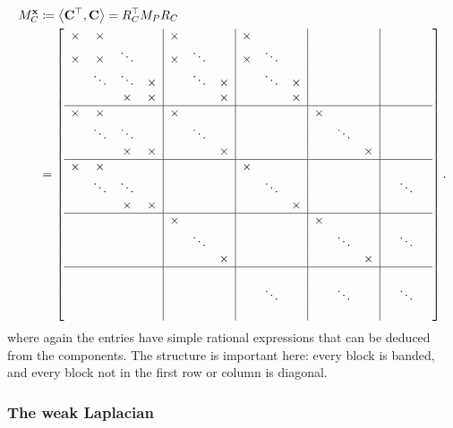\documentclass[hidelinks,onefignum,onetabnum]{siamart220329}
\def\bfC{{\bf C}}
\def\bfx{{\bf x}}
\def\ip<#1>{\left\langle{#1}\right\rangle}
\begin{document}
\begin{align*}
M_C^\bfx &\coloneqq  \ip<\bfC^\top, \bfC> = R_C^\top M_P R_C \\
&= \left[\begin{array}{c c c c | c c c | c c c | c c c | c c c}
\times & \times &    &        & \times &   &         & \times &   &    &&&\\
\times & \times & \ddots &         & \times & \ddots &         & \times & \ddots &    &&&\\
  & \ddots & \ddots & \times       &   & \ddots & \times       &   & \ddots & \times  &&&\\
  &    & \times & \times      &   &    & \times       &   &    & \times  &&&\\
  \hline
  \times & \times &    &       & \times &   &     &&&    & \times &   &   \\
    & \ddots & \ddots &        &   & \ddots &    &&&     &  & \ddots &   \\
     &   & \times & \times      &   &   & \times  &&&     &   &  & \times \\
	 \hline
	 \times & \times &    &  &&&     & \times &   &     &&&    &  &   &   \\
	 & \ddots & \ddots &     &&&   &   & \ddots &    &&&     &  & \ddots &   \\
	  &   & \times & \times  &&&    &   &   & \times  &&&     &   &  &  \\
	  \hline
	    &&&     & \times &   &     &&&    & \times &   &     &  &   &   \\
	  &&&   &   & \ddots &    &&&     &  & \ddots &     &  & \ddots &   \\
	   &&&    &   &   & \times  &&&     &   &  & \times    &   &  &  \\
	   \hline 
	   &&&     &  &   &     &&&    &  &   &     &  &   &   \\
	   &&&   &   &  &    && \ddots &     &  & \ddots &     &  & \ddots &   \\
		&&&    &   &   &   &&&     &   &  &     &   &  &  \\	   
\end{array}\right].
\end{align*}
where again the entries have simple rational expressions that can be deduced from the components. The structure is important here:  every block is banded, and every block not in the first row or column is diagonal. 

\subsubsection{The weak Laplacian}
\end{document}
